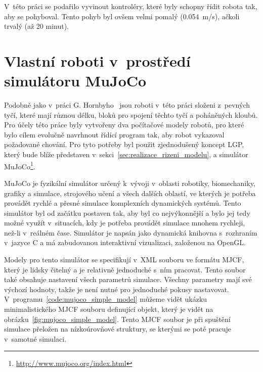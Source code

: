 V~této práci se podařilo vyvinout kontroléry, které byly schopny řídit robota tak, aby se pohyboval.
Tento pohyb byl ovšem velmi pomalý (0.054~m/s), ačkoli trvalý (až 20 minut).



\section{Vlastní roboti v~prostředí simulátoru MuJoCo}
\label{sec:vlastni_roboti}

Podobně jako v~práci G. Hornbyho~\cite{Hornby2003} jsou roboti v~této práci složeni z~pevných tyčí, které mají různou délku, bloků pro spojení těchto tyčí a poháněných kloubů.
Pro účely této práce byly vytvořeny dva počítačové modely robotů, pro které bylo cílem evolučně navrhnout řídící program tak, aby robot vykazoval požadované chování.
Pro tyto potřeby byl použit zjednodušený koncept LGP, který bude blíže představen v~sekci~\ref{sec:realizace_rizeni_modelu}, a simulátor MuJoCo\footnote{\url{http://www.mujoco.org/index.html}}.

MuJoCo je fyzikální simulátor určený k~vývoji v~oblasti robotiky, biomechaniky, grafiky a simulace, strojového učení a všech dalších oblastí, ve kterých je potřeba provádět rychlé a přesné simulace komplexních dynamických systémů.
Tento simulátor byl od začátku postaven tak, aby byl co nejvýkonnější a bylo jej tedy možné využít v~situacích, kdy je potřeba provádět simulace mnohem rychleji, než-li v~reálném čase.
Simulátor je napsán jako dynamická knihovna s~rozhraním v~jazyce C a má zabudovanou interaktivní vizualizaci, založenou na OpenGL.

Modely pro tento simulátor se specifikují v~XML souboru ve formátu MJCF, který je lidsky čitelný a je relativně jednoduché s~ním pracovat.
Tento soubor také obsahuje nastavení všech parametrů simulace.
Všechny parametry mají své výchozí hodnoty, takže je není nutné pro jednoduché pokusy nastavovat.
V~programu~\ref{code:mujoco_simple_model} můžeme vidět ukázku minimalistického MJCF souboru definující objekt, který je vidět na obrázku~\ref{fig:mujoco_simple_model}.
Tento MJCF soubor je při spuštění simulace přeložen na nízkoúrovňové struktury, se kterými se poté pracuje v~samotné simulaci.

